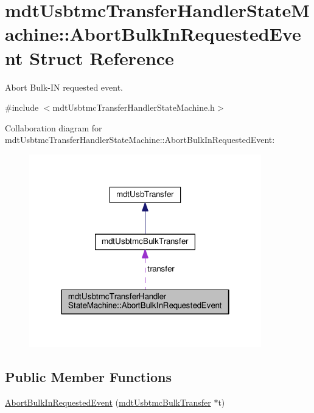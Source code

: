 \hypertarget{structmdt_usbtmc_transfer_handler_state_machine_1_1_abort_bulk_in_requested_event}{\section{mdt\-Usbtmc\-Transfer\-Handler\-State\-Machine\-:\-:Abort\-Bulk\-In\-Requested\-Event Struct Reference}
\label{structmdt_usbtmc_transfer_handler_state_machine_1_1_abort_bulk_in_requested_event}
}


Abort Bulk-\/\-I\-N requested event.  




{\ttfamily \#include $<$mdt\-Usbtmc\-Transfer\-Handler\-State\-Machine.\-h$>$}



Collaboration diagram for mdt\-Usbtmc\-Transfer\-Handler\-State\-Machine\-:\-:Abort\-Bulk\-In\-Requested\-Event\-:
\nopagebreak
\begin{figure}[H]
\begin{center}
\leavevmode
\includegraphics[width=286pt]{structmdt_usbtmc_transfer_handler_state_machine_1_1_abort_bulk_in_requested_event__coll__graph}
\end{center}
\end{figure}
\subsection*{Public Member Functions}
\begin{DoxyCompactItemize}
\item 
\hyperlink{structmdt_usbtmc_transfer_handler_state_machine_1_1_abort_bulk_in_requested_event_a6c29c6e020357b9abd59452f988bfd63}{Abort\-Bulk\-In\-Requested\-Event} (\hyperlink{classmdt_usbtmc_bulk_transfer}{mdt\-Usbtmc\-Bulk\-Transfer} $\ast$t)
\end{DoxyCompactItemize}
